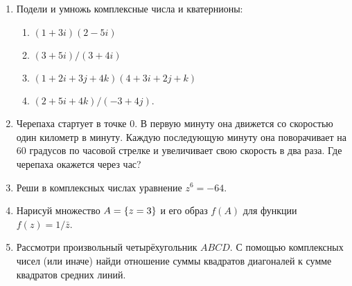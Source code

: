 \documentclass[12pt]{article} %
\let\Re\relax
\DeclareMathOperator{\Re}{Re}
\begin{document}
\begin{enumerate}
    \item Подели и умножь комплексные числа и кватернионы: 
    \begin{multicols}{2}
    \begin{enumerate}
        \item $(1+3i)(2-5i)$ 
        \item $(3+5i)/(3+4i)$
        \item $(1+2i+3j+4k)(4+3i+2j+k)$
        \item $(2+5i+4k)/(-3+4j)$.
    \end{enumerate}
    \end{multicols}
    \item Черепаха стартует в точке $0$. В первую минуту она движется со скоростью один километр в минуту.
    Каждую последующую минуту она поворачивает на 60 градусов по часовой стрелке и увеличивает свою скорость в два раза. 
    Где черепаха окажется через час?
    \item Реши в комплексных числах уравнение $z^6 = -64$.
    \item Нарисуй множество $A =\{ \Re z = 3 \}$ и его образ $f(A)$ для функции $f(z) = 1/\bar z$.
    \item Рассмотри произвольный четырёхугольник $ABCD$. 
    С помощью комплексных чисел (или иначе) найди отношение суммы квадратов диагоналей к сумме квадратов средних линий.

\end{enumerate}

\newpage
{}
\end{document}
